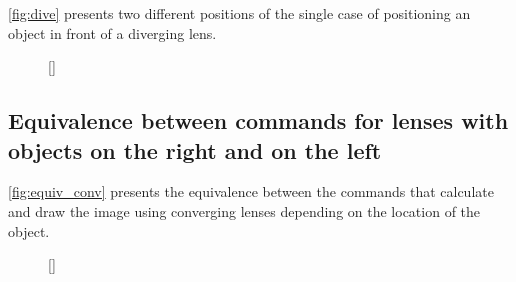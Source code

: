 \documentclass[a4paper,10pt]{article}
\begin{document}
\autoref{fig:dive} presents two different positions of the single case of positioning an object in front of a diverging lens.

\begin{figure}[!ht]
  \centering
  \begin{minipage}[c]{0.45\linewidth}
  \end{minipage} %
  \begin{minipage}[c]{0.45\linewidth}
  \end{minipage}
  [\linewidth]{
    \quad\quad\quad
  }
\end{figure}

\subsection{Equivalence between commands for lenses with objects on the right and on the left}

\autoref{fig:equiv_conv} presents the equivalence between the commands that calculate and draw the image using converging lenses depending on the location of the object.

\begin{figure}[!ht]
  \centering
  \begin{minipage}[c]{0.45\linewidth}
  \end{minipage} %
  \begin{minipage}[c]{0.45\linewidth}
  \end{minipage}
  [\linewidth]{
    \hfill
  }
\end{figure}
\end{document}
